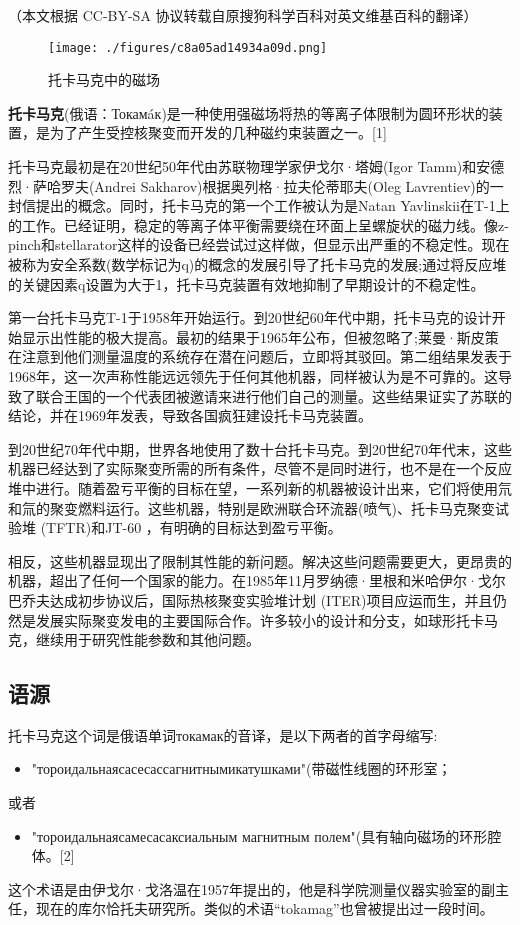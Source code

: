 
（本文根据 CC-BY-SA 协议转载自原搜狗科学百科对英文维基百科的翻译）

\begin{figure}[ht]
\centering
\texttt{[image: ./figures/c8a05ad14934a09d.png]}
\caption{托卡马克中的磁场} \label{fig_TKMK_11}
\end{figure}

\textbf{托卡马克}(俄语：Токамáк)是一种使用强磁场将热的等离子体限制为圆环形状的装置，是为了产生受控核聚变而开发的几种磁约束装置之一。[1]

托卡马克最初是在20世纪50年代由苏联物理学家伊戈尔·塔姆(Igor Tamm)和安德烈·萨哈罗夫(Andrei Sakharov)根据奥列格·拉夫伦蒂耶夫(Oleg Lavrentiev)的一封信提出的概念。同时，托卡马克的第一个工作被认为是Natan Yavlinskii在T-1上的工作。已经证明，稳定的等离子体平衡需要绕在环面上呈螺旋状的磁力线。像z-pinch和stellarator这样的设备已经尝试过这样做，但显示出严重的不稳定性。现在被称为安全系数(数学标记为q)的概念的发展引导了托卡马克的发展;通过将反应堆的关键因素q设置为大于1，托卡马克装置有效地抑制了早期设计的不稳定性。

第一台托卡马克T-1于1958年开始运行。到20世纪60年代中期，托卡马克的设计开始显示出性能的极大提高。最初的结果于1965年公布，但被忽略了;莱曼·斯皮策在注意到他们测量温度的系统存在潜在问题后，立即将其驳回。第二组结果发表于1968年，这一次声称性能远远领先于任何其他机器，同样被认为是不可靠的。这导致了联合王国的一个代表团被邀请来进行他们自己的测量。这些结果证实了苏联的结论，并在1969年发表，导致各国疯狂建设托卡马克装置。

到20世纪70年代中期，世界各地使用了数十台托卡马克。到20世纪70年代末，这些机器已经达到了实际聚变所需的所有条件，尽管不是同时进行，也不是在一个反应堆中进行。随着盈亏平衡的目标在望，一系列新的机器被设计出来，它们将使用氘和氚的聚变燃料运行。这些机器，特别是欧洲联合环流器(喷气)、托卡马克聚变试验堆 (TFTR)和JT-60 ，有明确的目标达到盈亏平衡。

相反，这些机器显现出了限制其性能的新问题。解决这些问题需要更大，更昂贵的机器，超出了任何一个国家的能力。在1985年11月罗纳德·里根和米哈伊尔·戈尔巴乔夫达成初步协议后，国际热核聚变实验堆计划 (ITER)项目应运而生，并且仍然是发展实际聚变发电的主要国际合作。许多较小的设计和分支，如球形托卡马克，继续用于研究性能参数和其他问题。

\subsection{语源}
托卡马克这个词是俄语单词токамак的音译，是以下两者的首字母缩写:
\begin{itemize}
\item "тороидальнаясасесассагнитнымикатушками"(带磁性线圈的环形室；
\end{itemize}
或者
\begin{itemize}
\item "тороидальнаясамесасаксиальным магнитным полем"(具有轴向磁场的环形腔体。[2]
\end{itemize}
这个术语是由伊戈尔·戈洛温在1957年提出的，他是科学院测量仪器实验室的副主任，现在的库尔恰托夫研究所。类似的术语“tokamag”也曾被提出过一段时间。

